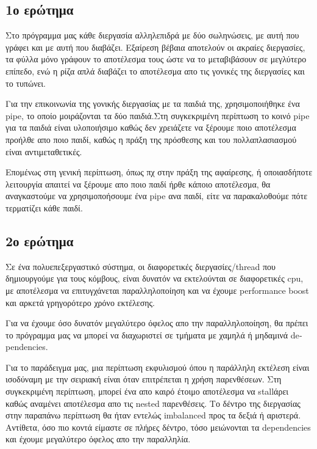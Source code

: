 \documentclass[12pt]{article}
\begin{document}
\subsection*{1ο ερώτημα}

Στο πρόγραμμα μας κάθε διεργασία αλληλεπιδρά με δύο σωληνώσεις, με αυτή που γράφει και με αυτή που διαβάζει. Εξαίρεση βέβαια αποτελούν οι ακραίες διεργασίες, τα φύλλα μόνο γράφουν το αποτέλεσμα τους ώστε να το μεταβιβάσουν σε μεγλύτερο επίπεδο, ενώ η ρίζα απλά διαβάζει το αποτέλεσμα απο τις γονικές της διεργασίες και το τυπώνει.

Για την επικοινωνία της γονικής διεργασίας με τα παιδιά της, χρησιμοποιήθηκε ένα \textlatin{pipe}, το οποίο μοιράζονται τα δύο παιδιά.Στη συγκεκριμένη περίπτωση το κοινό  \textlatin{pipe} για τα παιδιά είναι υλοποιήσιμο καθώς δεν χρειάζετε να ξέρουμε ποιο αποτέλεσμα προήλθε απο ποιο παιδί, καθώς η πράξη της πρόσθεσης και του πολλαπλασιασμού είναι αντιμεταθετικές.

Επομένως στη γενική περίπτωση, όπως πχ στην πράξη της αφαίρεσης, ή οποιασδήποτε λειτουργία απαιτεί να ξέρουμε απο ποιο παιδί ήρθε κάποιο αποτέλεσμα, θα αναγκαστούμε να χρησιμοποήσουμε ένα \textlatin{pipe} ανα παιδί, είτε να παρακαλοθούμε πότε τερματίζει κάθε παιδί.


\subsection*{2ο ερώτημα}

Σε ένα πολυεπεξεργαστικό σύστημα, οι διαφορετικές διεργασίες/\textlatin{thread} που δημιουργούμε για τους κόμβους, είναι δυνατόν να εκτελούνται σε διαφορετικές \textlatin{cpu}, με αποτέλεσμα να επιτυγχάνεται παραλληλοποίηση και να έχουμε \textlatin{performance boost} και αρκετά γρηγορότερο χρόνο εκτέλεσης.

Για να έχουμε όσο δυνατόν μεγαλύτερο όφελος απο την παραλληλοποίηση, θα πρέπει το πρόγραμμα μας να μπορεί να διαχωριστεί σε τμήματα με χαμηλά ή μηδαμινά \textlatin{dependencies}.

Για το παράδειγμα μας, μια περίπτωση εκφυλισμού όπου η παράλληλη εκτέλεση είναι ισοδύναμη με την σειριακή είναι όταν επιτρέπεται η χρήση παρενθέσεων. Στη συγκεκριμένη περίπτωση, μπορεί ένα απο καιρό έτοιμο αποτέλεσμα να \textlatin{stall}άρει καθώς αναμένει αποτέλεσμα απο τις \textlatin{nested} παρενθέσεις. Το δέντρο της διεργασίας στην παραπάνω περίπτωση θα ήταν εντελώς \textlatin{imbalanced} προς τα δεξιά ή αριστερά. Αντίθετα, όσο πιο κοντά είμαστε σε πλήρες δέντρο, τόσο μειώνονται τα \textlatin{dependencies} και έχουμε μεγαλύτερο όφελος απο την παραλληλία.
\end{document}

